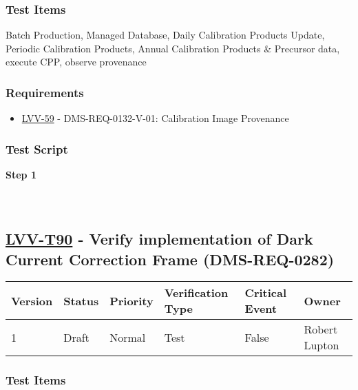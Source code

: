 \hypertarget{test-items-178}{%
\subsubsection{Test Items}\label{test-items-178}}

Batch Production, Managed Database, Daily Calibration Products Update,
Periodic Calibration Products, Annual Calibration Products \& Precursor
data, execute CPP, observe provenance

\hypertarget{requirements-179}{%
\subsubsection{Requirements}\label{requirements-179}}

\begin{itemize}
\tightlist
\item
  \href{https://jira.lsstcorp.org/browse/LVV-59}{LVV-59} -
  DMS-REQ-0132-V-01: Calibration Image Provenance
\end{itemize}

\hypertarget{test-script-179}{%
\subsubsection{Test Script}\label{test-script-179}}

\textbf{Step 1}\\
~\\
~\\

\hypertarget{lvv-t90---verify-implementation-of-dark-current-correction-frame-dms-req-0282}{%
\subsection{\texorpdfstring{\href{https://jira.lsstcorp.org/secure/Tests.jspa\#/testCase/LVV-T90}{LVV-T90}
- Verify implementation of Dark Current Correction Frame
(DMS-REQ-0282)}{LVV-T90 - Verify implementation of Dark Current Correction Frame (DMS-REQ-0282)}}\label{lvv-t90---verify-implementation-of-dark-current-correction-frame-dms-req-0282}}

\begin{longtable}[]{@{}llllll@{}}
\toprule
Version & Status & Priority & Verification Type & Critical Event &
Owner\tabularnewline
\midrule
\endhead
1 & Draft & Normal & Test & False & Robert Lupton\tabularnewline
\bottomrule
\end{longtable}

\hypertarget{test-items-179}{%
\subsubsection{Test Items}\label{test-items-179}}

